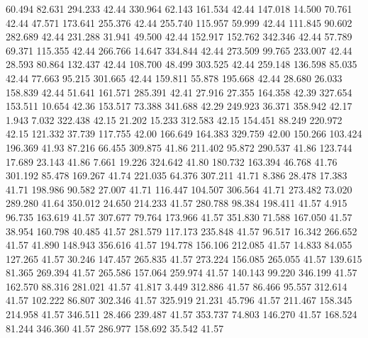   60.494   82.631  294.233        42.44
 330.964   62.143  161.534        42.44
 147.018   14.500   70.761        42.44
  47.571  173.641  255.376        42.44
 255.740  115.957   59.999        42.44
 111.845   90.602  282.689        42.44
 231.288   31.941   49.500        42.44
 152.917  152.762  342.346        42.44
  57.789   69.371  115.355        42.44
 266.766   14.647  334.844        42.44
 273.509   99.765  233.007        42.44
  28.593   80.864  132.437        42.44
 108.700   48.499  303.525        42.44
 259.148  136.598   85.035        42.44
  77.663   95.215  301.665        42.44
 159.811   55.878  195.668        42.44
  28.680   26.033  158.839        42.44
  51.641  161.571  285.391        42.41
  27.916   27.355  164.358        42.39
 327.654  153.511   10.654        42.36
 153.517   73.388  341.688        42.29
 249.923   36.371  358.942        42.17
   1.943    7.032  322.438        42.15
  21.202   15.233  312.583        42.15
 154.451   88.249  220.972        42.15
 121.332   37.739  117.755        42.00
 166.649  164.383  329.759        42.00
 150.266  103.424  196.369        41.93
  87.216   66.455  309.875        41.86
 211.402   95.872  290.537        41.86
 123.744   17.689   23.143        41.86
   7.661   19.226  324.642        41.80
 180.732  163.394   46.768        41.76
 301.192   85.478  169.267        41.74
 221.035   64.376  307.211        41.71
   8.386   28.478   17.383        41.71
 198.986   90.582   27.007        41.71
 116.447  104.507  306.564        41.71
 273.482   73.020  289.280        41.64
 350.012   24.650  214.233        41.57
 280.788   98.384  198.411        41.57
   4.915   96.735  163.619        41.57
 307.677   79.764  173.966        41.57
 351.830   71.588  167.050        41.57
  38.954  160.798   40.485        41.57
 281.579  117.173  235.848        41.57
  96.517   16.342  266.652        41.57
  41.890  148.943  356.616        41.57
 194.778  156.106  212.085        41.57
  14.833   84.055  127.265        41.57
  30.246  147.457  265.835        41.57
 273.224  156.085  265.055        41.57
 139.615   81.365  269.394        41.57
 265.586  157.064  259.974        41.57
 140.143   99.220  346.199        41.57
 162.570   88.316  281.021        41.57
  41.817    3.449  312.886        41.57
  86.466   95.557  312.614        41.57
 102.222   86.807  302.346        41.57
 325.919   21.231   45.796        41.57
 211.467  158.345  214.958        41.57
 346.511   28.466  239.487        41.57
 353.737   74.803  146.270        41.57
 168.524   81.244  346.360        41.57
 286.977  158.692   35.542        41.57

